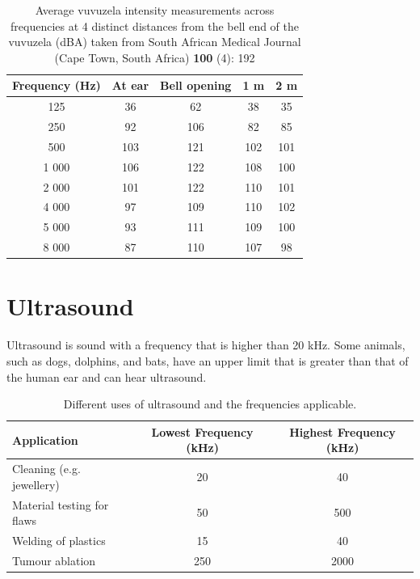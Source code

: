 \begin{table}[H]
\begin{center}
\begin{tabular}{ccccc}\hline
Frequency (Hz) & At ear & Bell opening & 1 m & 2 m \\ \hline
125&   36  	&62	 &38	& 35 \\ \hline
250&	92 &	106	& 82	&	 85 \\ \hline
500&	103 & 121&	 102&	 101 		\\ \hline
1 000&	106 & 122&	 108&	 100 	\\  \hline
2 000&	101 & 122&	 110&	 101 	\\ \hline
4 000&	97 & 109&	 110&	 102 	\\ \hline
5 000&	93 & 111&	 109&	 100 		\\ \hline
8 000&  87 & 110&	 107&		 98 	\\ \hline
\end{tabular}
\label{table:vuvuzelas}
\caption{Average vuvuzela intensity measurements across frequencies at 4 distinct distances from the bell end of the vuvuzela (dBA) taken from South African Medical Journal (Cape Town, South Africa) \textbf{100} (4): 192}
\end{center}
\end{table}


    \label{m38800*cid6}
            \section{Ultrasound}
            \nopagebreak
      \label{m38800*id185135}Ultrasound is sound with a frequency that is higher than 20 kHz. Some animals, such as dogs, dolphins, and bats, have an upper limit that is greater than that of the human ear and can hear ultrasound.
          \begin{table}[H]
        \begin{center}
      \label{m38800*eip-558}
    \noindent
      \begin{tabular}{|l|c|c|}\hline
        Application &
        Lowest Frequency (kHz) &
        Highest Frequency (kHz) \\ \hline
        Cleaning (e.g.\@{} jewellery) &
        20 &
        40 \\ \hline
        Material testing for flaws &
        50 &
        500 \\ \hline
        Welding of plastics &
        15 &
        40 \\ \hline
        Tumour ablation &
        250 &
        2000 \\ \hline
    \end{tabular}
      \end{center}
    \caption{Different uses of ultrasound and the frequencies applicable.}
\end{table}
    \par
  \par 

